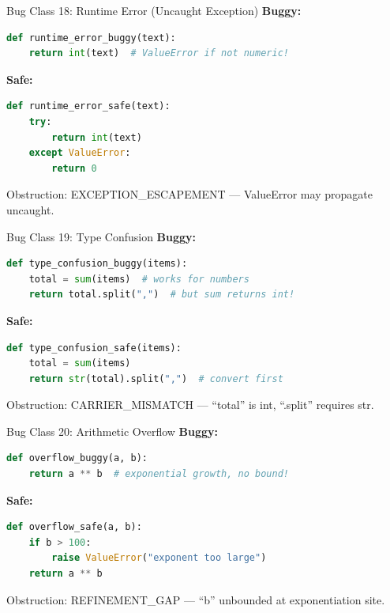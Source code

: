 \documentclass[aspectratio=169,10pt]{beamer}
\newcommand{\warn}[1]{\begin{center}
  \colorbox{warnbg}{\parbox{0.88\textwidth}{\centering\small #1}}\end{center}}
\begin{document}
\begin{frame}[fragile]{Bug Class 18: Runtime Error (Uncaught Exception)}
\textbf{Buggy:}
\begin{lstlisting}[language=Python, basicstyle=\ttfamily\scriptsize]
def runtime_error_buggy(text):
    return int(text)  # ValueError if not numeric!
\end{lstlisting}
\textbf{Safe:}
\begin{lstlisting}[language=Python, basicstyle=\ttfamily\scriptsize]
def runtime_error_safe(text):
    try:
        return int(text)
    except ValueError:
        return 0
\end{lstlisting}
\warn{Obstruction: EXCEPTION\_ESCAPEMENT --- ValueError may propagate uncaught.}
\end{frame}

\begin{frame}[fragile]{Bug Class 19: Type Confusion}
\textbf{Buggy:}
\begin{lstlisting}[language=Python, basicstyle=\ttfamily\scriptsize]
def type_confusion_buggy(items):
    total = sum(items)  # works for numbers
    return total.split(",")  # but sum returns int!
\end{lstlisting}
\textbf{Safe:}
\begin{lstlisting}[language=Python, basicstyle=\ttfamily\scriptsize]
def type_confusion_safe(items):
    total = sum(items)
    return str(total).split(",")  # convert first
\end{lstlisting}
\warn{Obstruction: CARRIER\_MISMATCH --- ``total'' is int, ``.split'' requires str.}
\end{frame}

\begin{frame}[fragile]{Bug Class 20: Arithmetic Overflow}
\textbf{Buggy:}
\begin{lstlisting}[language=Python, basicstyle=\ttfamily\scriptsize]
def overflow_buggy(a, b):
    return a ** b  # exponential growth, no bound!
\end{lstlisting}
\textbf{Safe:}
\begin{lstlisting}[language=Python, basicstyle=\ttfamily\scriptsize]
def overflow_safe(a, b):
    if b > 100:
        raise ValueError("exponent too large")
    return a ** b
\end{lstlisting}
\warn{Obstruction: REFINEMENT\_GAP --- ``b'' unbounded at exponentiation site.}
\end{frame}
\end{document}
